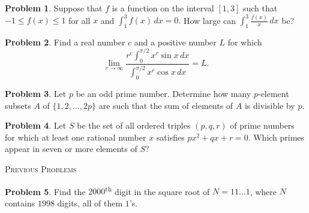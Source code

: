 \documentclass{scrartcl}
\theoremstyle{definition}
\newtheorem{prob}{Problem}
\begin{document}

	\setcounter{prob}{13}
	\begin{prob}%
		Suppose that $f$ is a function on the interval $[1,3]$ such that $-1\le f(x)\le 1$ for all $x$ and $\displaystyle \int_1^3f(x)\,dx=0.$ How large can $\displaystyle\int_1^3\frac{f(x)}x\,dx$ be?
	\end{prob}

	\setcounter{prob}{15}
	\begin{prob}%
		Find a real number $c$ and a positive number $L$ for which
		\[\lim_{r\to\infty}\frac{r^c\int_0^{\pi/2}x^r\sin x\,dx}{\int_0^{\pi/2}x^r\cos x\,dx}=L.\]
	\end{prob}

	\begin{prob}%
		Let $p$ be an odd prime number. Determine how many $p$-element subsets $A$ of $ \{1,2,\dots,2p\}$ are such that the sum of elements of \(A\) is divisible by $p$.
	\end{prob}

	\begin{prob}%
		Let $S$ be the set of all ordered triples $(p,q,r)$ of prime numbers for which at least one rational number $x$ satisfies $px^2+qx+r=0.$ Which primes appear in seven or more elements of $S?$
	\end{prob}

	\newpage

	\begin{center}
		\textsc{Previous Problems}
	\end{center}

	\setcounter{prob}{2}
	\begin{prob}
		Find the $2000$\textsuperscript{th} digit in the square root of $N = 11\dots1$, where $N$ contains $1998$ digits, all of them $1$'s.
	\end{prob}
\end{document}
